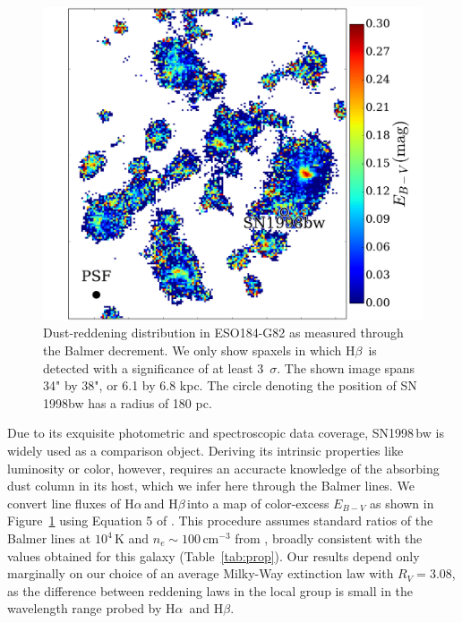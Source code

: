 \documentclass[traditabstract]{aa}
\newcommand{\hb}{H$\beta$}
\newcommand{\ha}{H$\alpha$}
\begin{document}
\begin{figure}
\includegraphics[angle=0, width=0.99\columnwidth]{Figs/MUSE_SN1998bw_EB-V.pdf}
\caption{Dust-reddening distribution in ESO184-G82 as measured through the Balmer decrement. We only show spaxels in which \hb\, is detected with a significance of at least 3~$\sigma$. The shown image spans 34" by 38", or 6.1 by 6.8 kpc. The circle denoting the position of SN\,1998bw has a radius of 180 pc.}
\label{fig:ebv}
\end{figure}

Due to its exquisite photometric and spectroscopic data coverage, SN1998\,bw is widely used as a comparison object. Deriving its intrinsic properties like luminosity or color, however, requires an accuracte knowledge of the absorbing dust column in its host, which we infer here through the Balmer lines. We convert line fluxes of \ha\,and \hb\,into a map of color-excess $E_{B-V}$ as shown in Figure~\ref{fig:ebv} using Equation 5 of \citet{2015A&A...581A.125K}. This procedure assumes standard ratios of the Balmer lines at $10^4$\,K and $n_e\sim100\,\mathrm{cm}^{-3}$ from \citet{1989agna.book.....O}, broadly consistent with the values obtained for this galaxy (Table~\ref{tab:prop}). Our results depend only marginally on our choice of an average Milky-Way extinction law \citep{1992ApJ...395..130P} with $R_V=3.08$, as the difference between reddening laws in the local group is small in the wavelength range probed by \ha\, and \hb. 
\end{document}
